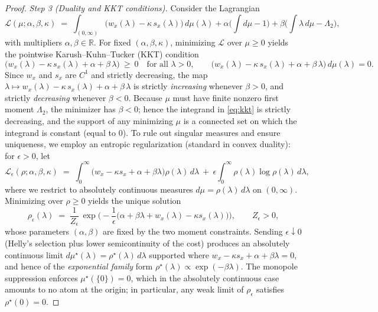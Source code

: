 \documentclass[10pt]{article}
\theoremstyle{definition}
\theoremstyle{plain}
\begin{document}
\begin{proof}
\smallskip
\emph{Step 3 (Duality and KKT conditions).}
Consider the Lagrangian
\[
\mathcal L(\mu;\alpha,\beta,\kappa)\;=\;\int_{(0,\infty)}\!\!\!\bigl(w_x(\lambda)-\kappa\,s_x(\lambda)\bigr)\,d\mu(\lambda)
+\alpha\Big(\int d\mu - 1\Big)+\beta\Big(\int \lambda\,d\mu-\Lambda_2\Big),
\]
with multipliers $\alpha,\beta\in\mathbb R$. For fixed $(\alpha,\beta,\kappa)$, minimizing $\mathcal L$
over $\mu\ge 0$ yields the pointwise Karush--Kuhn--Tucker (KKT) condition
\begin{equation}
\label{eq:kkt}
\bigl(w_x(\lambda)-\kappa\,s_x(\lambda)+\alpha+\beta\,\lambda\bigr)\ \ge\ 0
\quad\text{for all }\lambda>0,\qquad
\bigl(w_x(\lambda)-\kappa\,s_x(\lambda)+\alpha+\beta\,\lambda\bigr)\,d\mu(\lambda)=0.
\end{equation}
Since $w_x$ and $s_x$ are $C^1$ and strictly decreasing, the map
\(
\lambda\mapsto w_x(\lambda)-\kappa\,s_x(\lambda)+\alpha+\beta\,\lambda
\)
is strictly \emph{increasing} whenever $\beta>0$, and strictly \emph{decreasing} whenever $\beta<0$.
Because $\mu$ must have finite nonzero first moment $\Lambda_2$, the minimizer has $\beta<0$; hence
the integrand in \eqref{eq:kkt} is strictly decreasing, and the support of any minimizing $\mu$ is a
connected set on which the integrand is constant (equal to $0$). To rule out singular measures and ensure
uniqueness, we employ an entropic regularization (standard in convex duality): for $\epsilon>0$, let
\[
\mathcal L_\epsilon(\rho;\alpha,\beta,\kappa)\;=\;\int_{0}^{\infty}\!\Big(w_x-\kappa s_x + \alpha + \beta \lambda\Big)\rho(\lambda)\,d\lambda
\ +\ \epsilon\int_{0}^{\infty}\rho(\lambda)\log \rho(\lambda)\,d\lambda,
\]
where we restrict to absolutely continuous measures $d\mu=\rho(\lambda)\,d\lambda$ on $(0,\infty)$.
Minimizing over $\rho\ge 0$ yields the unique solution
\[
\rho_{\epsilon}(\lambda)\;=\;\frac{1}{Z_\epsilon}\,\exp\!\Big(-\frac{1}{\epsilon}\big(\alpha+\beta\lambda + w_x(\lambda)-\kappa s_x(\lambda)\big)\Big),
\qquad Z_\epsilon>0,
\]
whose parameters $(\alpha,\beta)$ are fixed by the two moment constraints. Sending $\epsilon\downarrow 0$
(Helly’s selection plus lower semicontinuity of the cost) produces an absolutely continuous limit
$d\mu^\star(\lambda)=\rho^\star(\lambda)\,d\lambda$ supported where $w_x-\kappa s_x+\alpha+\beta\lambda=0$,
and hence of the \emph{exponential family} form $\rho^\star(\lambda)\propto \exp(-\beta \lambda)$.
The monopole suppression enforces $\mu^\star(\{0\})=0$, which in the absolutely continuous case amounts to
no atom at the origin; in particular, any weak limit of $\rho_\epsilon$ satisfies $\rho^\star(0)=0$.


\end{proof}
\end{document}
